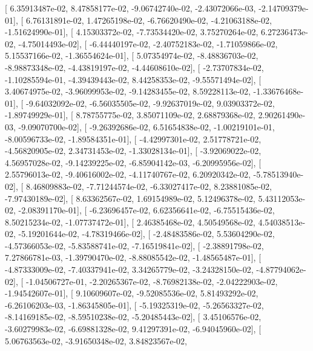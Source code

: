 \documentclass{article}
\begin{document}
       [  6.35913487e-02,   8.47858177e-02,  -9.06742740e-02,
         -2.43072066e-03,  -2.14709379e-01],
       [  6.76131891e-02,   1.47265198e-02,  -6.76620490e-02,
         -4.21063188e-02,  -1.51624990e-01],
       [  4.15303372e-02,  -7.73534420e-02,   3.75270264e-02,
          6.27236473e-02,  -4.75014493e-02],
       [ -6.44440197e-02,  -2.40752183e-02,  -1.71059866e-02,
          5.15537166e-02,  -1.36554624e-01],
       [  5.07354974e-02,  -8.48836703e-02,  -8.98873348e-02,
         -4.43819197e-02,  -4.44608610e-02],
       [ -2.73707834e-02,  -1.10285594e-01,  -4.39439443e-02,
          8.44258353e-02,  -9.55571494e-02],
       [  3.40674975e-02,  -3.96099953e-02,  -9.14283455e-02,
          8.59228113e-02,  -1.33676468e-01],
       [ -9.64032092e-02,  -6.56035505e-02,  -9.92637019e-02,
          9.03903372e-02,  -1.89749929e-01],
       [  8.78755775e-02,   3.85071109e-02,   2.68879368e-02,
          2.90261490e-03,  -9.09070700e-02],
       [ -9.26392686e-02,   6.51654838e-02,  -1.00219101e-01,
         -8.00596733e-02,  -1.89584351e-01],
       [ -4.42997301e-02,   2.51778721e-02,  -4.56820905e-02,
          2.34731453e-02,  -1.33028134e-01],
       [ -3.92069022e-02,   4.56957028e-02,  -9.14239225e-02,
         -6.85904142e-03,  -6.20995956e-02],
       [  2.55796013e-02,  -9.40616002e-02,  -4.11740767e-02,
          6.20920342e-02,  -5.78513940e-02],
       [  8.46809883e-02,  -7.71244574e-02,  -6.33027417e-02,
          8.23881085e-02,  -7.97430189e-02],
       [  8.63362567e-02,   1.69154989e-02,   5.12496378e-02,
          5.43112053e-02,  -2.08391170e-01],
       [ -6.23696457e-02,   6.62356641e-02,  -6.75515436e-02,
          8.50215234e-02,  -1.07737472e-01],
       [  2.46385468e-02,   4.50549568e-02,   4.54038513e-02,
         -5.19201644e-02,  -4.78319466e-02],
       [ -2.48483586e-02,   5.53604290e-02,  -4.57366053e-02,
         -5.83588741e-02,  -7.16519841e-02],
       [ -2.38891798e-02,   7.27866781e-03,  -1.39790470e-02,
         -8.88085542e-02,  -1.48565487e-01],
       [ -4.87333009e-02,  -7.40337941e-02,   3.34265779e-02,
         -3.24328150e-02,  -4.87794062e-02],
       [ -1.04506727e-01,  -2.20265367e-02,  -8.76982138e-02,
         -2.04222903e-02,  -1.94542607e-01],
       [  9.10609607e-02,  -9.52085536e-02,   5.81493292e-02,
         -6.26106203e-03,  -1.86345805e-01],
       [ -5.19325319e-02,  -5.26563327e-02,  -8.14169185e-02,
         -8.59510238e-02,  -5.20485443e-02],
       [  3.45106576e-02,  -3.60279983e-02,  -6.69881328e-02,
          9.41297391e-02,  -6.94045960e-02],
       [  5.06763563e-02,  -3.91650348e-02,   3.84823567e-02,
\end{document}
